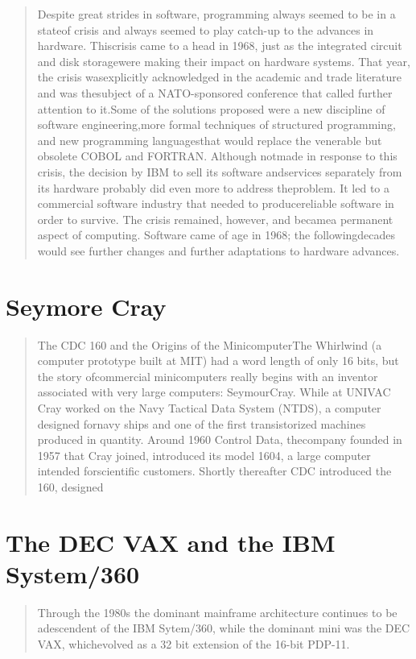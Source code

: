 \begin{quotation}
    Despite great strides in software, programming always seemed to be in a stateof crisis and always seemed to play catch-up to the advances in hardware. Thiscrisis came to a head in 1968, just as the integrated circuit and disk storagewere making their impact on hardware systems. That year, the crisis wasexplicitly acknowledged in the academic and trade literature and was thesubject of a NATO-sponsored conference that called further attention to it.Some of the solutions proposed were a new discipline of software engineering,more formal techniques of structured programming, and new programming languagesthat would replace the venerable but obsolete COBOL and FORTRAN. Although notmade in response to this crisis, the decision by IBM to sell its software andservices separately from its hardware probably did even more to address theproblem. It led to a commercial software industry that needed to producereliable software in order to survive. The crisis remained, however, and becamea permanent aspect of computing. Software came of age in 1968; the followingdecades would see further changes and further adaptations to hardware advances.
\end{quotation}
\section{Seymore Cray}
\begin{quotation}
    The CDC 160 and the Origins of the MinicomputerThe Whirlwind (a computer prototype built at MIT) had a word length of only 16 bits, but the story ofcommercial minicomputers really begins with an inventor associated with very large computers: SeymourCray. While at UNIVAC Cray worked on the Navy Tactical Data System (NTDS), a computer designed fornavy ships and one of the first transistorized machines produced in quantity. Around 1960 Control Data, thecompany founded in 1957 that Cray joined, introduced its model 1604, a large computer intended forscientific customers. Shortly thereafter CDC introduced the 160, designed
\cite{nothing_new_since_von_neumann_2000}
\end{quotation}
\section{The DEC VAX and the IBM System/360}
\begin{quotation}
    Through the 1980s the dominant mainframe architecture continues to be adescendent of the IBM Sytem/360, while the dominant mini was the DEC VAX, whichevolved as a 32 bit extension of the 16-bit PDP-11.
\cite{nothing_new_since_von_neumann_2000}
\end{quotation}
